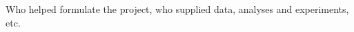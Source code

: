 \documentclass[manuscript]{stjour}
\begin{document}
\authorcontributions 
Who helped formulate the project, who supplied data, analyses and
experiments, etc.







%


\end{document}
